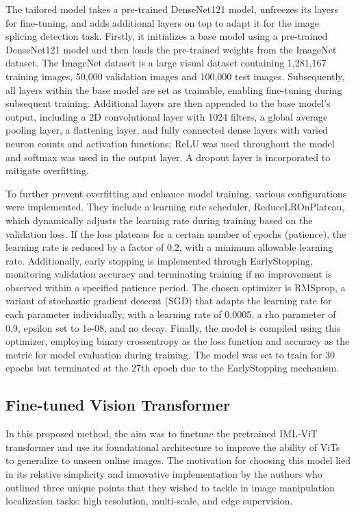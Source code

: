 The tailored model takes a pre-trained DenseNet121 model, unfreezes its layers for fine-tuning, and adds additional layers on top to adapt it for the image splicing detection task. Firstly, it initializes a base model using a pre-trained DenseNet121 model and then loads the pre-trained weights from the ImageNet dataset. The ImageNet dataset is a large visual dataset containing 1,281,167 training images, 50,000 validation images and 100,000 test images. Subsequently, all layers within the base model are set as trainable, enabling fine-tuning during subsequent training. Additional layers are then appended to the base model's output, including a 2D convolutional layer with 1024 filters, a global average pooling layer, a flattening layer, and fully connected dense layers with varied neuron counts and activation functions; ReLU was used throughout the model and softmax was used in the output layer. A dropout layer is incorporated to mitigate overfitting. 

To further prevent overfitting and enhance model training, various configurations were implemented. They include a learning rate scheduler, ReduceLROnPlateau, which dynamically adjusts the learning rate during training based on the validation loss. If the loss plateaus for a certain number of epochs (patience), the learning rate is reduced by a factor of 0.2, with a minimum allowable learning rate. Additionally, early stopping is implemented through EarlyStopping, monitoring validation accuracy and terminating training if no improvement is observed within a specified patience period. The chosen optimizer is RMSprop, a variant of stochastic gradient descent (SGD) that adapts the learning rate for each parameter individually, with a learning rate of 0.0005, a rho parameter of 0.9, epsilon set to 1e-08, and no decay. Finally, the model is compiled using this optimizer, employing binary crossentropy as the loss function and accuracy as the metric for model evaluation during training. The model was set to train for 30 epochs but terminated at the 27th epoch due to the EarlyStopping mechanism. 

\subsection{Fine-tuned Vision Transformer} \label{sec:ss2}

In this proposed method, the aim was to finetune the pretrained IML-ViT \cite{ma2023imlvit} transformer and use its foundational architecture to improve the ability of ViTs to generalize to unseen online images. The motivation for choosing this model lied in its relative simplicity and innovative implementation by the authors who outlined three unique points that they wished to tackle in image manipulation localization tasks: high resolution, multi-scale, and edge supervision. 

